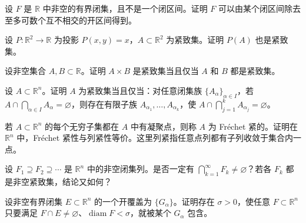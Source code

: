 \newpage
\noindent\begin{minipage}{\textwidth}
设 $F$ 是 $\mathbb R$ 中非空的有界闭集，且不是一个闭区间。证明 $F$ 可以由某个闭区间除去至多可数个互不相交的开区间得到。
\end{minipage}\par\vfill
\noindent\begin{minipage}{\textwidth}
设 $P:\mathbb R^2\to\mathbb R$ 为投影 $P(x,y)=x$，$A\subset\mathbb R^2$ 为紧致集。证明 $P(A)$ 也是紧致集。
\end{minipage}\par\vfill
\noindent\begin{minipage}{\textwidth}
设非空集合 $A,B\subset\mathbb R$。证明 $A\times B$ 是紧致集当且仅当 $A$ 和 $B$ 都是紧致集。
\end{minipage}\par\vfill
\newpage
\noindent\begin{minipage}{\textwidth}
设 $A\subset\mathbb R^n$。证明 $A$ 为紧致集当且仅当：对任意闭集族 $\{A_\alpha\}_{\alpha\in I}$，若 $A\cap\bigcap_{\alpha\in I}A_\alpha=\varnothing$，则存在有限子族 $A_{\alpha_1},\ldots,A_{\alpha_k}$，使 $A\cap\bigcap_{j=1}^k A_{\alpha_j}=\varnothing$。
\end{minipage}\par\vfill
\noindent\begin{minipage}{\textwidth}
若 $A\subset\mathbb R^n$ 的每个无穷子集都在 $A$ 中有凝聚点，则称 $A$ 为 Fréchet 紧的。证明在 $\mathbb R^n$ 中，Fréchet 紧性与列紧性等价。这里列紧指任意点列都有子列收敛于集合内一点。
\end{minipage}\par\vfill
\noindent\begin{minipage}{\textwidth}
设 $F_1\supseteq F_2\supseteq\cdots$ 是 $\mathbb R^n$ 中的非空闭集列。是否一定有 $\bigcap_{k=1}^{\infty}F_k\ne\varnothing$？若各 $F_k$ 都是非空紧致集，结论又如何？
\end{minipage}\par\vfill
\newpage
\noindent\begin{minipage}{\textwidth}
设非空有界闭集 $E\subset\mathbb R^n$ 的一个开覆盖为 $\{G_\alpha\}$。证明存在 $\sigma>0$，使任意 $F\subset\mathbb R^n$ 只要满足 $F\cap E\ne\varnothing$、$\operatorname{diam}F<\sigma$，就被某个 $G_\alpha$ 包含。
\end{minipage}\par\vfill

